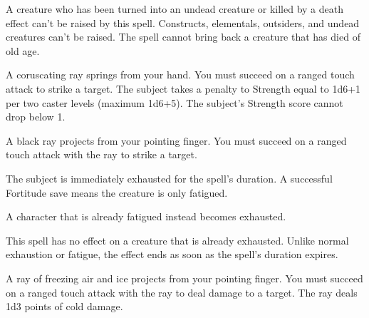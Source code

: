 \begin{multicols}{2}
\begin{small}
\smallskip\noindent A creature who has been turned into an undead creature or killed by a death effect can't be raised by this spell. Constructs, elementals, outsiders, and undead creatures can't be raised. The spell cannot bring back a creature that has died of old age.


\noindent A coruscating ray springs from your hand. You must succeed on a ranged touch attack to strike a target. The subject takes a penalty to Strength equal to 1d6+1 per two caster levels (maximum 1d6+5). The subject's Strength score cannot drop below 1.

\noindent A black ray projects from your pointing finger. You must succeed on a ranged touch attack with the ray to strike a target.

\smallskip\noindent The subject is immediately exhausted for the spell's duration. A successful Fortitude save means the creature is only fatigued.

\smallskip\noindent A character that is already fatigued instead becomes exhausted.

\smallskip\noindent This spell has no effect on a creature that is already exhausted. Unlike normal exhaustion or fatigue, the effect ends as soon as the spell's duration expires.


\noindent A ray of freezing air and ice projects from your pointing finger. You must succeed on a ranged touch attack with the ray to deal damage to a target. The ray deals 1d3 points of cold damage.


\end{small}
\end{multicols}
